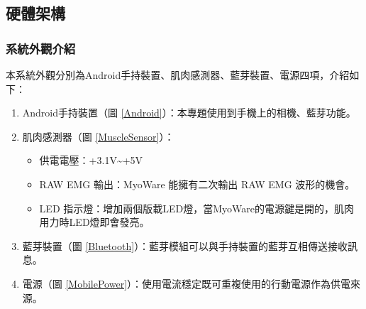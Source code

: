 \documentclass[12pt]{article}  %
\theoremstyle{plain}
\begin{document}
\subsection{硬體架構}

\subsubsection{系統外觀介紹}
本系統外觀分別為Android手持裝置、肌肉感測器、藍芽裝置、電源四項，介紹如下：
\begin{enumerate}
\item Android手持裝置（圖 \ref{Android}）：本專題使用到手機上的相機、藍芽功能。
\item 肌肉感測器（圖 \ref{MuscleSensor}）：
\begin{itemize}
\item 供電電壓：+3.1V\textasciitilde +5V
\item RAW EMG 輸出：MyoWare 能擁有二次輸出 RAW EMG 波形的機會。
\item LED 指示燈：增加兩個版載LED燈，當MyoWare的電源鍵是開的，肌肉用力時LED燈即會發亮。
\end{itemize}
\item 藍芽裝置（圖 \ref{Bluetooth}）：藍芽模組可以與手持裝置的藍芽互相傳送接收訊息。
\item 電源（圖 \ref{MobilePower}）：使用電流穩定既可重複使用的行動電源作為供電來源。
\end{enumerate}
\end{document}
